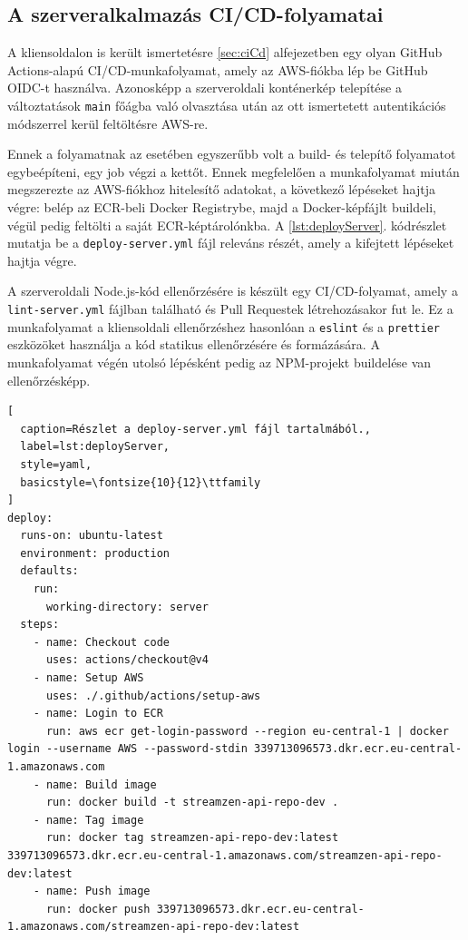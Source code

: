 \subsection{A szerveralkalmazás CI/CD-folyamatai}

A kliensoldalon is került ismertetésre \ref{sec:ciCd} alfejezetben egy olyan GitHub Actions-alapú CI/CD-munkafolyamat, amely az AWS-fiókba lép be GitHub OIDC-t használva. Azonosképp a szerveroldali konténerkép telepítése a változtatások \verb|main| főágba való olvasztása után az ott ismertetett autentikációs módszerrel kerül feltöltésre AWS-re.

Ennek a folyamatnak az esetében egyszerűbb volt a build- és telepítő folyamatot egybeépíteni, egy job végzi a kettőt. Ennek megfelelően a munkafolyamat miután megszerezte az AWS-fiókhoz hitelesítő adatokat, a következő lépéseket hajtja végre: belép az ECR-beli Docker Registrybe, majd a Docker-képfájlt buildeli, végül pedig feltölti a saját ECR-képtárolónkba. A \ref{lst:deployServer}. kódrészlet mutatja be a \verb|deploy-server.yml| fájl releváns részét, amely a kifejtett lépéseket hajtja végre.

A szerveroldali Node.js-kód ellenőrzésére is készült egy CI/CD-folyamat, amely a \verb|lint-server.yml| fájlban található és Pull Requestek létrehozásakor fut le. Ez a munkafolyamat a kliensoldali ellenőrzéshez hasonlóan a \verb|eslint| és a \verb|prettier| eszközöket használja a kód statikus ellenőrzésére és formázására. A munkafolyamat végén utolsó lépésként pedig az NPM-projekt buildelése van ellenőrzésképp.

\begin{minipage}{0.92\textwidth}
  \begin{lstlisting}[
  caption=Részlet a deploy-server.yml fájl tartalmából.,
  label=lst:deployServer,
  style=yaml,
  basicstyle=\fontsize{10}{12}\ttfamily
]
deploy:
  runs-on: ubuntu-latest
  environment: production
  defaults:
    run:
      working-directory: server
  steps:
    - name: Checkout code
      uses: actions/checkout@v4
    - name: Setup AWS
      uses: ./.github/actions/setup-aws
    - name: Login to ECR
      run: aws ecr get-login-password --region eu-central-1 | docker login --username AWS --password-stdin 339713096573.dkr.ecr.eu-central-1.amazonaws.com
    - name: Build image
      run: docker build -t streamzen-api-repo-dev .
    - name: Tag image
      run: docker tag streamzen-api-repo-dev:latest 339713096573.dkr.ecr.eu-central-1.amazonaws.com/streamzen-api-repo-dev:latest
    - name: Push image
      run: docker push 339713096573.dkr.ecr.eu-central-1.amazonaws.com/streamzen-api-repo-dev:latest
\end{lstlisting}
\end{minipage}

